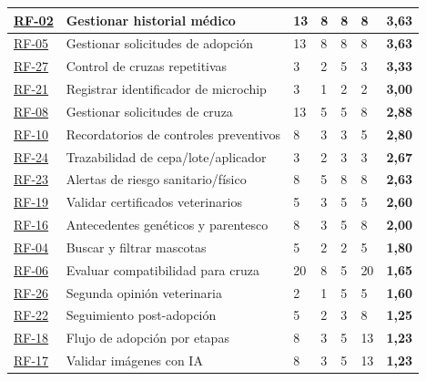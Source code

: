 \documentclass[journal,onecolumn]{IEEEtran}
\begin{document}
\begin{longtable}{@{}p{1.4cm} p{5.4cm} p{1.5cm} p{1.5cm} p{1.5cm} p{1.5cm} p{1.3cm}@{}}
		\hline
		\hyperref[tab:RF-02]{RF-02} & Gestionar historial médico & 13 & 8 & 8 & 8 & \textbf{3,63} \\
		\hline
		\hyperref[tab:RF-05]{RF-05} & Gestionar solicitudes de adopción & 13 & 8 & 8 & 8 & \textbf{3,63} \\
		\hline
		\hyperref[tab:RF-27]{RF-27} & Control de cruzas repetitivas & 3 & 2 & 5 & 3 & \textbf{3,33} \\
		\hline
		\hyperref[tab:RF-21]{RF-21} & Registrar identificador de microchip & 3 & 1 & 2 & 2 & \textbf{3,00} \\
		\hline
		\hyperref[tab:RF-08]{RF-08} & Gestionar solicitudes de cruza & 13 & 5 & 5 & 8 & \textbf{2,88} \\
		\hline
		\hyperref[tab:RF-10]{RF-10} & Recordatorios de controles preventivos & 8 & 3 & 3 & 5 & \textbf{2,80} \\
		\hline
		\hyperref[tab:RF-24]{RF-24} & Trazabilidad de cepa/lote/aplicador & 3 & 2 & 3 & 3 & \textbf{2,67} \\
		\hline
		\hyperref[tab:RF-23]{RF-23} & Alertas de riesgo sanitario/físico & 8 & 5 & 8 & 8 & \textbf{2,63} \\
		\hline
		\hyperref[tab:RF-19]{RF-19} & Validar certificados veterinarios & 5 & 3 & 5 & 5 & \textbf{2,60} \\
		\hline
		\hyperref[tab:RF-16]{RF-16} & Antecedentes genéticos y parentesco & 8 & 3 & 5 & 8 & \textbf{2,00} \\
		\hline
		\hyperref[tab:RF-04]{RF-04} & Buscar y filtrar mascotas & 5 & 2 & 2 & 5 & \textbf{1,80} \\
		\hline
		\hyperref[tab:RF-06]{RF-06} & Evaluar compatibilidad para cruza & 20 & 8 & 5 & 20 & \textbf{1,65} \\
		\hline
		\hyperref[tab:RF-26]{RF-26} & Segunda opinión veterinaria & 2 & 1 & 5 & 5 & \textbf{1,60} \\
		\hline
		\hyperref[tab:RF-22]{RF-22} & Seguimiento post-adopción & 5 & 2 & 3 & 8 & \textbf{1,25} \\
		\hline
		\hyperref[tab:RF-18]{RF-18} & Flujo de adopción por etapas & 8 & 3 & 5 & 13 & \textbf{1,23} \\
		\hline
		\hyperref[tab:RF-17]{RF-17} & Validar imágenes con IA & 8 & 3 & 5 & 13 & \textbf{1,23} \\
	\end{longtable}
	
\end{document}

